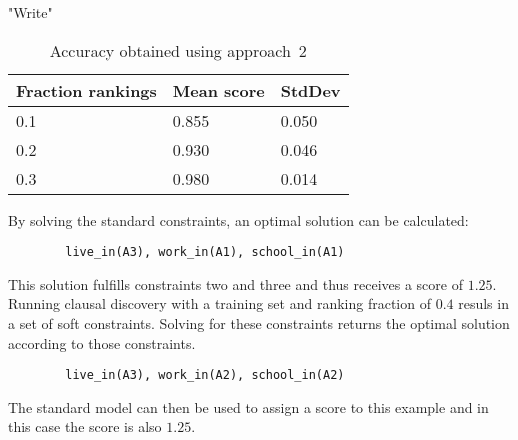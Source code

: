 \begin{experiment}

		"Write" 
		\begin{table}[!htp]
		\begin{tabularx}{\textwidth}{XXX}
			\textbf{Fraction rankings}	& \textbf{Mean score}	& \textbf{StdDev} \\
			\toprule
			0.1 	& 0.855		& 0.050 \\
			0.2 	& 0.930		& 0.046 \\
			0.3 	& 0.980 	& 0.014 \\
		\end{tabularx}
		\label{tbl:exp_acc_approach2}
		\caption{Accuracy obtained using approach~2}
	\end{table}

\end{experiment}

\begin{experiment}
	By solving the standard constraints, an optimal solution can be calculated:
	\begin{verbatim}
		live_in(A3), work_in(A1), school_in(A1)
	\end{verbatim}
	This solution fulfills constraints two and three and thus receives a score of $1.25$.
	Running clausal discovery with a training set and ranking fraction of $0.4$ resuls in a set of soft constraints.
	Solving for these constraints returns the optimal solution according to those constraints.
	\begin{verbatim}
		live_in(A3), work_in(A2), school_in(A2)
	\end{verbatim}
	The standard model can then be used to assign a score to this example and in this case the score is also $1.25$.
\end{experiment}

